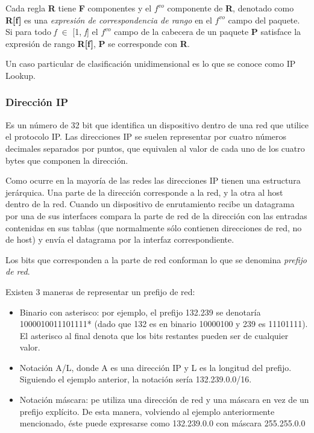 Cada regla \textbf{R} tiene \textbf{F} componentes y el $ f^{vo} $ componente de \textbf{R}, denotado como \textbf{R[f]} es una \textit{expresión de correspondencia de rango} en el $ f^{vo} $ campo del paquete. Si para todo \textit{f} $ \in $ [1, \textit{f}] el $ f^{vo} $ campo de la cabecera de un paquete \textbf{P} satisface la expresión de rango \textbf{R[f]}, \textbf{P} se corresponde con \textbf{R}.

Un caso particular de clasificación unidimensional es lo que se conoce como IP Lookup. 

\subsubsection{Dirección IP}

Es un número de 32 bit que identifica un dispositivo dentro de una red que utilice el protocolo IP. Las direcciones IP se suelen representar por cuatro números decimales separados por puntos, que equivalen al valor de cada uno de los cuatro bytes que componen la dirección.

Como ocurre en la mayoría de las redes las direcciones IP tienen una estructura jerárquica. Una parte de la dirección corresponde a la red, y la otra al host dentro de la red. Cuando un dispositivo de enrutamiento recibe un datagrama por una de sus interfaces compara la parte de red de la dirección con las entradas contenidas en sus tablas (que normalmente sólo contienen direcciones de red, no de host) y envía el datagrama por la interfaz correspondiente.

Los bits que corresponden a la parte de red conforman lo que se denomina \textit{prefijo de red}.

Existen 3 maneras de representar un prefijo de red:

\begin{itemize}
	\item Binario con asterisco: por ejemplo, el prefijo 132.239 se denotaría 1000010011101111* (dado que 132 es en binario 10000100 y 239 es 11101111). El asterisco al final denota que los bits restantes pueden ser de cualquier valor.
	\item Notación A/L, donde A es una dirección IP y L es la longitud del prefijo. Siguiendo el ejemplo anterior, la notación sería 132.239.0.0/16.
	\item Notación máscara: pe utiliza una dirección de red y una máscara en vez de un prefijo explícito. De esta manera, volviendo al ejemplo anteriormente mencionado, éste puede expresarse como 132.239.0.0 con máscara 255.255.0.0
\end{itemize}

